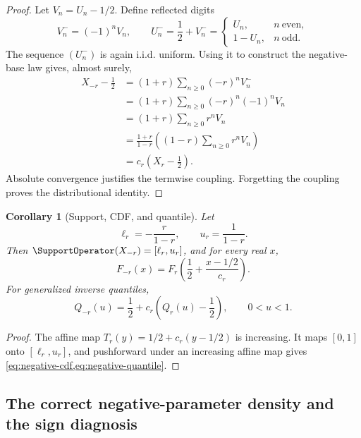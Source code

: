 \documentclass[11pt]{article}
\newtheorem{corollary}[theorem]{Corollary}
\theoremstyle{definition}
\begin{document}
\begin{proof}
Let \(V_n=U_n-1/2\).  Define reflected digits
\[
 V_n^-=(-1)^nV_n,
 \qquad
 U_n^-=\frac12+V_n^-=
 \begin{cases}
 U_n,&n\ \text{even},\\
 1-U_n,&n\ \text{odd}.
 \end{cases}
\]
The sequence \((U_n^-)\) is again i.i.d. uniform.  Using it to construct the negative-base
law gives, almost surely,
\begin{align*}
 X_{-r}-\frac12
  &=(1+r)\sum_{n\ge0}(-r)^nV_n^-\\
  &=(1+r)\sum_{n\ge0}(-r)^n(-1)^nV_n\\
  &=(1+r)\sum_{n\ge0}r^nV_n\\
  &=\frac{1+r}{1-r}\left((1-r)\sum_{n\ge0}r^nV_n\right)\\
  &=c_r\left(X_r-\frac12\right).
\end{align*}
Absolute convergence justifies the termwise coupling.  Forgetting the coupling proves
the distributional identity.
\end{proof}

\begin{corollary}[Support, CDF, and quantile]\label{cor:negative-cdf}
Let
\begin{equation}
 \ell_r=-\frac{r}{1-r},
 \qquad
 u_r=\frac{1}{1-r}.                                      \label{eq:negative-support}
\end{equation}
Then \(\SupportOperator(X_{-r})=[\ell_r,u_r]\), and for every real \(x\),
\begin{equation}
 \boxed{
 F_{-r}(x)=F_r\!\left(\frac12+\frac{x-1/2}{c_r}\right).}
                                                               \label{eq:negative-cdf}
\end{equation}
For generalized inverse quantiles,
\begin{equation}
 \boxed{
 Q_{-r}(u)=\frac12+c_r\left(Q_r(u)-\frac12\right),
 \qquad 0<u<1.}                                           \label{eq:negative-quantile}
\end{equation}
\end{corollary}

\begin{proof}
The affine map \(T_r(y)=1/2+c_r(y-1/2)\) is increasing.  It maps \([0,1]\) onto
\([\ell_r,u_r]\), and pushforward under an increasing affine map gives
\cref{eq:negative-cdf,eq:negative-quantile}.
\end{proof}

\subsection{The correct negative-parameter density and the sign diagnosis}
\end{document}

